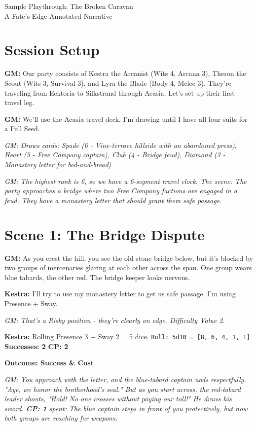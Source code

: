 \documentclass[11pt]{article}
\newcommand{\player}[1]{\textbf{#1:}}
\newcommand{\gm}[1]{\textit{GM: #1}}
\newcommand{\roll}[2]{\texttt{Roll: #1d10 = [#2]}}
\newcommand{\success}[1]{\textbf{Successes: #1}}
\newcommand{\cp}[1]{\textbf{CP: #1}}
\newcommand{\outcome}[1]{\textbf{Outcome: #1}}
\begin{document}
\begin{center}
{\LARGE Sample Playthrough: The Broken Caravan}\\
\vspace{0.5em}
{\large A Fate's Edge Annotated Narrative}
\end{center}

\section*{Session Setup}

\player{GM} Our party consists of Kestra the Arcanist (Wits 4, Arcana 3), Theron the Scout (Wits 3, Survival 3), and Lyra the Blade (Body 4, Melee 3). They're traveling from Ecktoria to Silkstrand through Acasia. Let's set up their first travel leg.

\player{GM} We'll use the Acasia travel deck. I'm drawing until I have all four suits for a Full Seed.

\gm{Draws cards: Spade (6 - Vine-terrace hillside with an abandoned press), Heart (5 - Free Company captain), Club (4 - Bridge feud), Diamond (3 - Monastery letter for bed-and-bread)}

\gm{The highest rank is 6, so we have a 6-segment travel clock. The scene: The party approaches a bridge where two Free Company factions are engaged in a feud. They have a monastery letter that should grant them safe passage.}

\section*{Scene 1: The Bridge Dispute}

\player{GM} As you crest the hill, you see the old stone bridge below, but it's blocked by two groups of mercenaries glaring at each other across the span. One group wears blue tabards, the other red. The bridge keeper looks nervous.

\player{Kestra} I'll try to use my monastery letter to get us safe passage. I'm using Presence + Sway.

\gm{That's a Risky position - they're clearly on edge. Difficulty Value 2.}

\player{Kestra} Rolling Presence 3 + Sway 2 = 5 dice. \roll{5}{8, 6, 4, 1, 1} \success{2} \cp{2}

\outcome{Success \& Cost}

\gm{You approach with the letter, and the blue-tabard captain nods respectfully. "Aye, we honor the brotherhood's seal." But as you start across, the red-tabard leader shouts, "Hold! No one crosses without paying our toll!" He draws his sword. \cp{1} spent: The blue captain steps in front of you protectively, but now both groups are reaching for weapons.}
\end{document}
